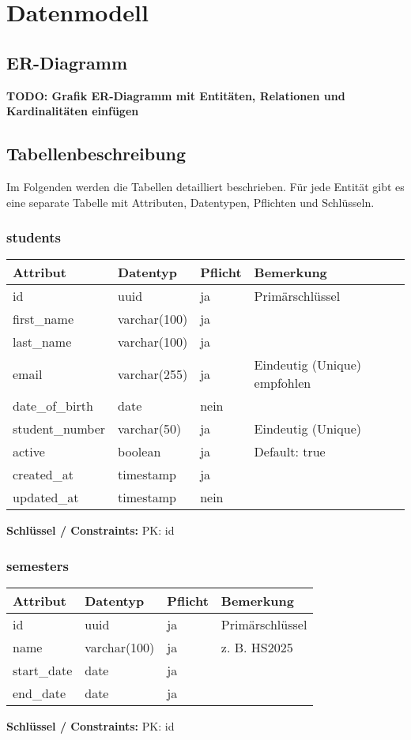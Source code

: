 \documentclass[12pt,a4paper]{article}
\begin{document}
    \section{Datenmodell}

    \subsection{ER-Diagramm}
    \textbf{TODO: Grafik ER-Diagramm mit Entitäten, Relationen und Kardinalitäten einfügen}

    \subsection{Tabellenbeschreibung}
    Im Folgenden werden die Tabellen detailliert beschrieben. Für jede Entität gibt es eine separate Tabelle mit Attributen, Datentypen, Pflichten und Schlüsseln.

    \subsubsection{students}
    \begin{longtable}{|L{4cm}|L{3cm}|L{3cm}|L{4cm}|}
        \hline
        \textbf{Attribut} & \textbf{Datentyp} & \textbf{Pflicht} & \textbf{Bemerkung} \\ \hline
        id & uuid & ja & Primärschlüssel \\ \hline
        first\_name & varchar(100) & ja &  \\ \hline
        last\_name & varchar(100) & ja &  \\ \hline
        email & varchar(255) & ja & Eindeutig (Unique) empfohlen \\ \hline
        date\_of\_birth & date & nein &  \\ \hline
        student\_number & varchar(50) & ja & Eindeutig (Unique) \\ \hline
        active & boolean & ja & Default: true \\ \hline
        created\_at & timestamp & ja &  \\ \hline
        updated\_at & timestamp & nein &  \\ \hline
    \end{longtable}
    \textbf{Schlüssel / Constraints:} PK: id

    \subsubsection{semesters}
    \begin{longtable}{|L{4cm}|L{3cm}|L{3cm}|L{4cm}|}
        \hline
        \textbf{Attribut} & \textbf{Datentyp} & \textbf{Pflicht} & \textbf{Bemerkung} \\ \hline
        id & uuid & ja & Primärschlüssel \\ \hline
        name & varchar(100) & ja & z. B. HS2025 \\ \hline
        start\_date & date & ja &  \\ \hline
        end\_date & date & ja &  \\ \hline
    \end{longtable}
    \textbf{Schlüssel / Constraints:} PK: id
\end{document}
